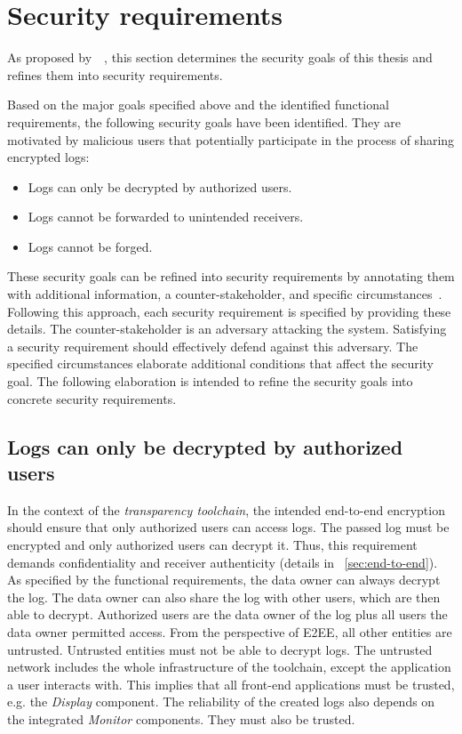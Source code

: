\documentclass[../main.tex]{subfiles}
\begin{document}
\section{Security requirements}\label{security-requriements}
As proposed by~\citeauthor{Fabian2010}~\cite{Fabian2010}, this section determines the security goals of this thesis and refines them into security requirements.


Based on the major goals specified above and the identified functional requirements, the following security goals have been identified.
They are motivated by malicious users that potentially participate in the process of sharing encrypted logs:
\begin{itemize}
    \item Logs can only be decrypted by authorized users.
    \item Logs cannot be forwarded to unintended receivers.
    \item Logs cannot be forged.
  \end{itemize}

These security goals can be refined into security requirements by annotating them with additional information, a counter-stakeholder, and specific circumstances~\cite{Fabian2010}.
Following this approach, each security requirement is specified by providing these details.
The counter-stakeholder is an adversary attacking the system.
Satisfying a security requirement should effectively defend against this adversary.
The specified circumstances elaborate additional conditions that affect the security goal.
The following elaboration is intended to refine the security goals into concrete security requirements.

\subsection{Logs can only be decrypted by authorized users}
In the context of the \emph{transparency toolchain}, the intended end-to-end encryption should ensure that only authorized users can access logs.
The passed log must be encrypted and only authorized users can decrypt it.
Thus, this requirement demands confidentiality and receiver authenticity (details in ~\cref{sec:end-to-end}).
As specified by the functional requirements, the data owner can always decrypt the log.
The data owner can also share the log with other users, which are then able to decrypt.
Authorized users are the data owner of the log plus all users the data owner permitted access.
From the perspective of E2EE, all other entities are untrusted.
Untrusted entities must not be able to decrypt logs.
The untrusted network includes the whole infrastructure of the toolchain, except the application a user interacts with.
This implies that all front-end applications must be trusted, e.g. the \emph{Display} component.
The reliability of the created logs also depends on the integrated \emph{Monitor} components.
They must also be trusted.
\end{document}
